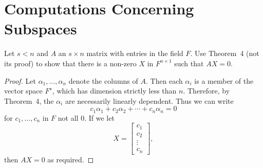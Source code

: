 \skipsection
\section{Computations Concerning Subspaces}

 Let $s < n$ and $A$ an $s\times n$ matrix with entries in
the field $F$. Use Theorem~4 (not its proof) to show that there is a
non-zero $X$ in $F^{n\times1}$ such that $AX = 0$.
\begin{proof}
  Let $\alpha_1,\dots,\alpha_n$ denote the columns of $A$. Then each
  $\alpha_i$ is a member of the vector space $F^s$, which has
  dimension strictly less than $n$. Therefore, by Theorem~4, the
  $\alpha_i$ are necessarily linearly dependent. Thus we can write
  \begin{equation*}
    c_1\alpha_1 + c_2\alpha_2 + \cdots + c_n\alpha_n = 0
  \end{equation*}
  for $c_1,\dots, c_n$ in $F$ not all $0$. If we let
  \begin{equation*}
    X =
    \begin{bmatrix}
      c_1 \\ c_2 \\ \vdots \\ c_n
    \end{bmatrix},
  \end{equation*}
  then $AX = 0$ as required.
\end{proof}

